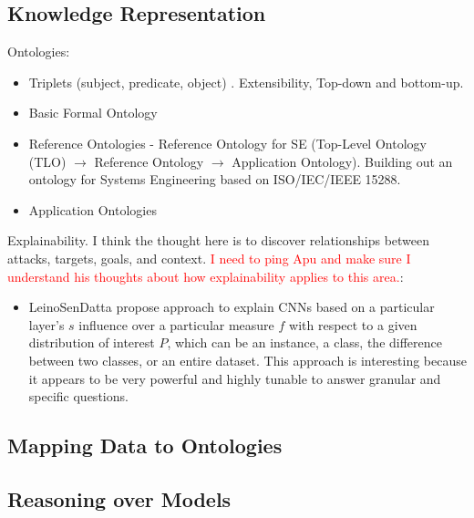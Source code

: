 \documentclass[11pt]{article}
\begin{document}
\subsection{Knowledge Representation}

Ontologies:

\begin{itemize}

    \item Triplets (subject, predicate, object) \cite{jenkins2010ontologies}. Extensibility, Top-down and bottom-up.
    
    \item Basic Formal Ontology \cite{iso/iec_dis_21838-2}
    
    \item Reference Ontologies - Reference Ontology for SE (Top-Level Ontology (TLO) $\rightarrow$ Reference Ontology $\rightarrow$ Application Ontology).  Building out an ontology for Systems Engineering based on ISO/IEC/IEEE 15288. \cite{orellana2019ontology}
    
    \item Application Ontologies
    
\end{itemize}
 
Explainability. I think the thought here is to discover relationships between attacks, targets, goals, and context.  \textcolor{red}{I need to ping Apu and make sure I understand his thoughts about how explainability applies to this area.}:

\begin{itemize}
    
    \item Leino\/Sen\/Datta propose approach to explain CNNs based on a particular layer's $s$ influence over a particular measure $f$ with respect to a given distribution of interest $P$, which can be an instance, a class, the difference between two classes, or an entire dataset.  This approach is interesting because it appears to be very powerful and highly tunable to answer granular and specific questions. \cite{leino2018influence}  
        
\end{itemize}

\subsection{Mapping Data to Ontologies}

\subsection{Reasoning over Models}
\end{document}
